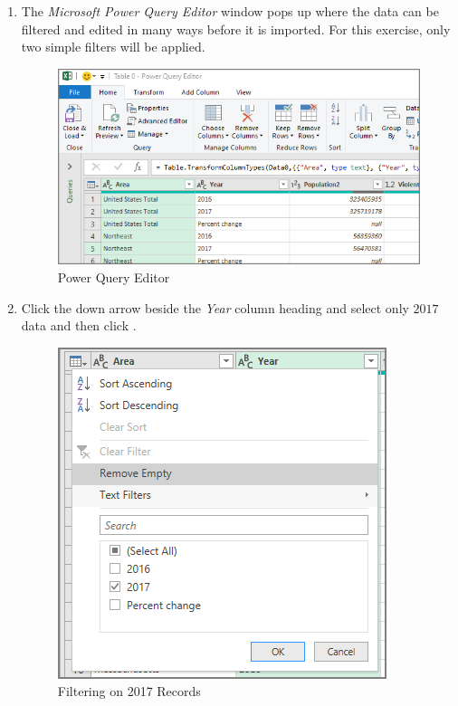 \begin{enumbox}
\begin{enumerate}
		\item The \textit{Microsoft Power Query Editor} window pops up where the data can be filtered and edited in many ways before it is imported. For this exercise, only two simple filters will be applied.

		\begin{figure}[H]
			\centering
			\includegraphics[width=\maxwidth{.95\linewidth}]{gfx/ch07_fig02e}
			\caption{Power Query Editor}
			\label{07:fig02e}
		\end{figure}

		\item Click the down arrow beside the \textit{Year} column heading and select only $ 2017 $ data and then click .

		\begin{figure}[H]
			\centering
			\includegraphics[width=\maxwidth{.75\linewidth}]{gfx/ch07_fig02f}
			\caption{Filtering on 2017 Records}
			\label{07:fig02f}
		\end{figure}


\end{enumerate}
\end{enumbox}
